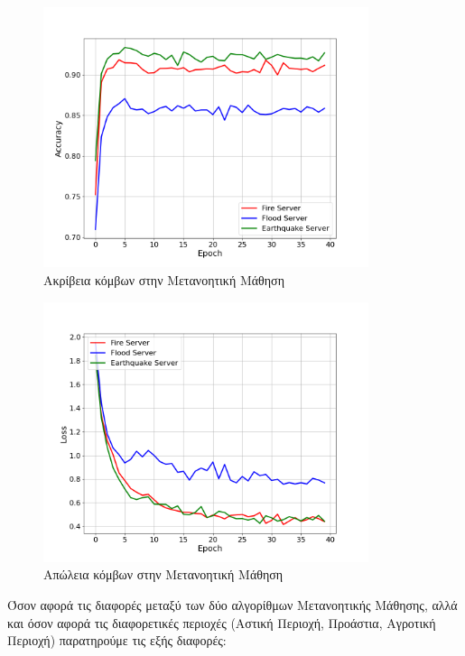 \newpage

\begin{figure}[H]
    \centering
    \includegraphics[width=0.85\textwidth]{figures/chapter4/User_Accuracies.png}
    \caption{Ακρίβεια κόμβων στην Μετανοητική Μάθηση}
    \label{fig19}
\end{figure}

\begin{figure}[H]
    \centering
    \includegraphics[width=0.85\textwidth]{figures/chapter4/User_Losses.png}
    \caption{Απώλεια κόμβων στην Μετανοητική Μάθηση}
    \label{fig20}
\end{figure}

\newpage

Όσον αφορά τις διαφορές μεταξύ των δύο αλγορίθμων Μετανοητικής Μάθησης, αλλά και όσον αφορά τις διαφορετικές περιοχές (Αστική Περιοχή, Προάστια, Αγροτική Περιοχή) παρατηρούμε τις εξής διαφορές:

